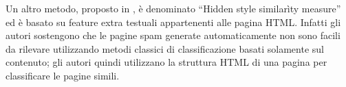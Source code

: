 Un altro metodo, proposto in \cite{DBLP:conf:airweb:UrvoyLF06}, è denominato ``Hidden style similarìty measure'' ed è basato su feature extra testuali appartenenti alle pagina HTML. Infatti gli autori sostengono che le pagine spam generate automaticamente non sono facili da rilevare utilizzando metodi classici di classificazione basati solamente sul contenuto; gli autori quindi utilizzano la struttura HTML di una pagina per classificare le pagine simili.




